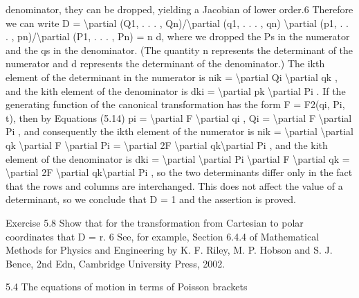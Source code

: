 denominator, they can be dropped, yielding a Jacobian of lower order.6
Therefore we can write
D = \textbackslash{}partial (Q1, . . . , Qn)/\textbackslash{}partial (q1, . . . , qn)
\textbackslash{}partial (p1, . . . , pn)/\textbackslash{}partial (P1, . . . , Pn) = \textbar{}n\textbar{}
\textbar{}d\textbar{},
where we dropped the Ps in the numerator and the qs in the denominator.
(The quantity \textbar{}n\textbar{} represents the determinant of the numerator and \textbar{}d\textbar{} represents the determinant of the denominator.) The ikth element of the determinant
in the numerator is
nik = \textbackslash{}partial Qi
\textbackslash{}partial qk
,
and the kith element of the denominator is
dki = \textbackslash{}partial pk
\textbackslash{}partial Pi
.
If the generating function of the canonical transformation has the form
F = F2(qi, Pi, t), then by Equations (5.14)
pi = \textbackslash{}partial F
\textbackslash{}partial qi
,
Qi = \textbackslash{}partial F
\textbackslash{}partial Pi
,
and consequently the ikth element of the numerator is
nik =
\textbackslash{}partial
\textbackslash{}partial qk
\textbackslash{}partial F
\textbackslash{}partial Pi
=
\textbackslash{}partial 2F
\textbackslash{}partial qk\textbackslash{}partial Pi
,
and the kith element of the denominator is
dki =
\textbackslash{}partial
\textbackslash{}partial Pi
\textbackslash{}partial F
\textbackslash{}partial qk
=
\textbackslash{}partial 2F
\textbackslash{}partial qk\textbackslash{}partial Pi
,
so the two determinants differ only in the fact that the rows and columns are
interchanged. This does not affect the value of a determinant, so we conclude
that D = 1 and the assertion is proved.
\begin{exercise}
Exercise 5.8 Show that for the transformation from Cartesian to polar
coordinates that D = r.
6 See, for example, Section 6.4.4 of Mathematical Methods for Physics and Engineering by
K. F. Riley, M. P. Hobson and S. J. Bence, 2nd Edn, Cambridge University Press, 2002.

5.4
The equations of motion in terms of Poisson brackets
\end{exercise}

